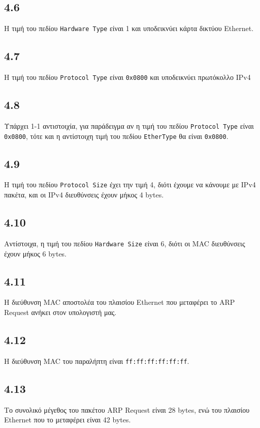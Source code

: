 		\subsection*{4.6}
			Η τιμή του πεδίου \verb|Hardware Type| είναι 1 και υποδεικνύει κάρτα δικτύου Ethernet.
			
		
		\subsection*{4.7}
			Η τιμή του πεδίου \verb|Protocol Type| είναι \verb|0x0800| και υποδεικνύει πρωτόκολλο IPv4 
			
		
		\subsection*{4.8}
			Υπάρχει 1-1 αντιστοιχία, για παράδειγμα αν η τιμή του πεδίου \verb|Protocol Type| είναι \verb|0x0800|, τότε και η αντίστοιχη τιμή του πεδίου \verb|EtherType| θα είναι \verb|0x0800|.
			
		
		\subsection*{4.9}
			Η τιμή του πεδίου \verb|Protocol Size| έχει την τιμή 4, διότι έχουμε να κάνουμε με IPv4 πακέτα, και οι IPv4 διευθύνσεις έχουν μήκος 4 bytes. 
		
		\subsection*{4.10}
			Αντίστοιχα, η τιμή του πεδίου \verb|Hardware Size| είναι 6, διότι οι MAC διευθύνσεις έχουν μήκος 6 bytes.
		
		\subsection*{4.11}
			Η διεύθυνση MAC αποστολέα του πλαισίου Ethernet που μεταφέρει το ARP Request ανήκει στον υπολογιστή μας.	
		
		\subsection*{4.12}
			Η διεύθυνση MAC του παραλήπτη είναι \verb|ff:ff:ff:ff:ff:ff|.
		
		\subsection*{4.13}
			Το συνολικό μέγεθος του πακέτου ARP Request είναι 28 bytes, ενώ του πλαισίου Ethernet που το μεταφέρει είναι 42 bytes.
		
